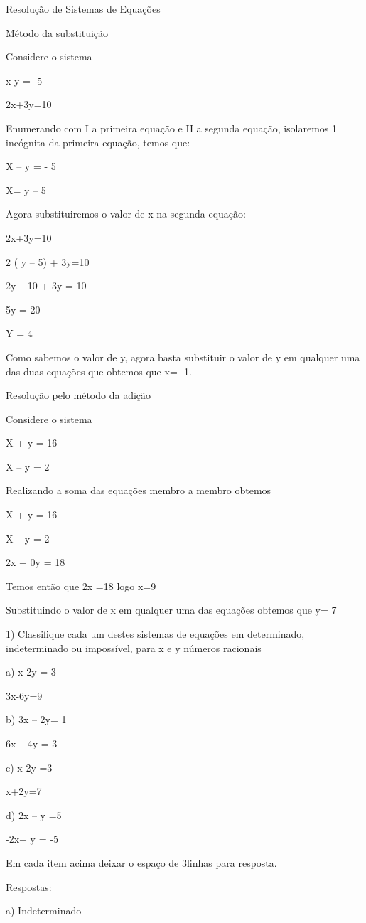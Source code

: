 Resolução de Sistemas de Equações

Método da substituição

Considere o sistema

x-y = -5

2x+3y=10

Enumerando com I a primeira equação e II a segunda equação, isolaremos 1
incógnita da primeira equação, temos que:

X -- y = - 5

X= y -- 5

Agora substituiremos o valor de x na segunda equação:

2x+3y=10

2 ( y -- 5) + 3y=10

2y -- 10 + 3y = 10

5y = 20

Y = 4

Como sabemos o valor de y, agora basta substituir o valor de y em
qualquer uma das duas equações que obtemos que x= -1.

Resolução pelo método da adição

Considere o sistema

X + y = 16

X -- y = 2

Realizando a soma das equações membro a membro obtemos

X + y = 16

X -- y = 2

2x + 0y = 18

Temos então que 2x =18 logo x=9

Substituindo o valor de x em qualquer uma das equações obtemos que y= 7


1) Classifique cada um destes sistemas de equações em determinado,
indeterminado ou impossível, para x e y números racionais

a) x-2y = 3

3x-6y=9

b) 3x -- 2y= 1

6x -- 4y = 3

c) x-2y =3

x+2y=7

d) 2x -- y =5

-2x+ y = -5

Em cada item acima deixar o espaço de 3linhas para resposta.

Respostas:

a) Indeterminado

